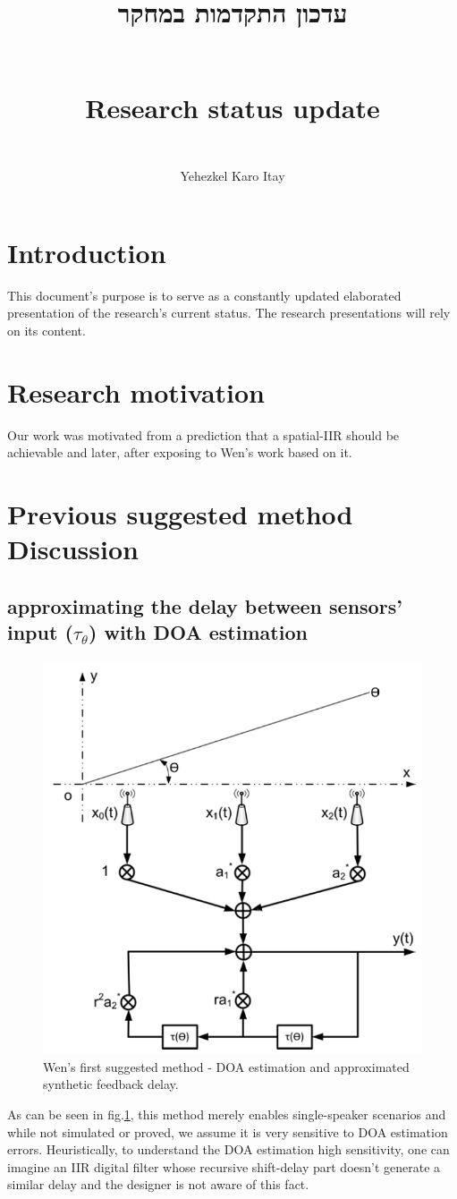 \documentclass[12pt]{article}
\title{
\begin{otherlanguage}{hebrew}
עדכון התקדמות במחקר
\end{otherlanguage}
\\
Research status update
}
\author{
\\Yehezkel Karo Itay
}
\begin{document}
\maketitle
\section*{Introduction}
This document's purpose is to serve as a constantly updated elaborated presentation of the research's current status.
The research presentations will rely on its content.
\section{Research motivation}



Our work was motivated from a prediction that a spatial-IIR should be achievable and later, after exposing to Wen's work \cite{FuxiARRAYMODEL} based on it.

\section*{Previous suggested method Discussion}

\subsection*{approximating the delay between sensors' input ($ \tau_{\theta} $) with DOA estimation}
\begin{figure}
\begin{center}
\includegraphics[width=.4\textwidth]{Media/WenFirstSuggestedMethod.PNG}
\caption{Wen's first suggested method - DOA estimation and approximated synthetic feedback delay.}
\end{center}
\label{fig:WenTauApproxDOAEst}
\end{figure}
As can be seen in fig.\ref{fig:WenTauApproxDOAEst}, this method merely enables single-speaker scenarios and while not simulated or proved, we assume it is very sensitive to DOA estimation errors. Heuristically, to understand the DOA estimation high sensitivity, one can imagine an IIR digital filter whose recursive shift-delay part doesn't generate a similar delay and the designer is not aware of this fact.
\end{document}

